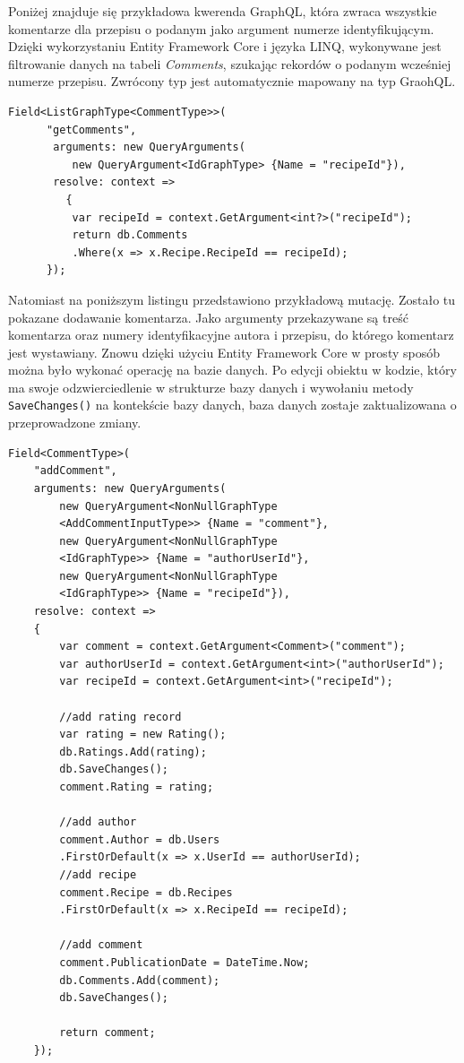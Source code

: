 Poniżej znajduje się przykładowa kwerenda GraphQL, która zwraca wszystkie komentarze dla przepisu o podanym jako argument numerze identyfikującym. Dzięki wykorzystaniu Entity Framework Core i języka LINQ, wykonywane jest filtrowanie danych na tabeli \textit{Comments}, szukając rekordów o podanym wcześniej numerze przepisu. Zwrócony typ jest automatycznie mapowany na typ GraohQL.
\begin{lstlisting}[language={[Sharp]C}]
 Field<ListGraphType<CommentType>>(
      "getComments",
       arguments: new QueryArguments(
          new QueryArgument<IdGraphType> {Name = "recipeId"}),
       resolve: context =>
         {
          var recipeId = context.GetArgument<int?>("recipeId");
          return db.Comments
          .Where(x => x.Recipe.RecipeId == recipeId);
      });
\end{lstlisting}

Natomiast na poniższym listingu przedstawiono przykładową mutację. Zostało tu pokazane dodawanie komentarza. Jako argumenty przekazywane są treść komentarza oraz numery identyfikacyjne autora i przepisu, do którego komentarz jest wystawiany. Znowu dzięki użyciu Entity Framework Core w prosty sposób można było wykonać operację na bazie danych. Po edycji obiektu w kodzie, który ma swoje odzwierciedlenie w strukturze bazy danych i wywołaniu metody \texttt{SaveChanges()} na kontekście bazy danych, baza danych zostaje zaktualizowana o przeprowadzone zmiany.

\begin{lstlisting}[language={[Sharp]C}]
Field<CommentType>(
    "addComment",
    arguments: new QueryArguments(
        new QueryArgument<NonNullGraphType
        <AddCommentInputType>> {Name = "comment"},
        new QueryArgument<NonNullGraphType
        <IdGraphType>> {Name = "authorUserId"},
        new QueryArgument<NonNullGraphType
        <IdGraphType>> {Name = "recipeId"}),
    resolve: context =>
    {
        var comment = context.GetArgument<Comment>("comment");
        var authorUserId = context.GetArgument<int>("authorUserId");
        var recipeId = context.GetArgument<int>("recipeId");

        //add rating record
        var rating = new Rating();
        db.Ratings.Add(rating);
        db.SaveChanges();
        comment.Rating = rating;

        //add author
        comment.Author = db.Users
        .FirstOrDefault(x => x.UserId == authorUserId);
        //add recipe
        comment.Recipe = db.Recipes
        .FirstOrDefault(x => x.RecipeId == recipeId);

        //add comment
        comment.PublicationDate = DateTime.Now;
        db.Comments.Add(comment);
        db.SaveChanges();

        return comment;
    });
\end{lstlisting}

